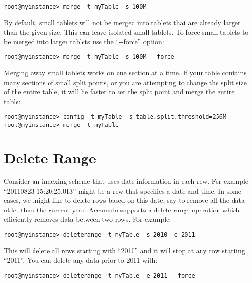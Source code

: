 \begingroup\fontsize{8pt}{8pt}\selectfont\begin{verbatim}
root@myinstance> merge -t myTable -s 100M
\end{verbatim}\endgroup

By default, small tablets will not be merged into tablets that are
already larger than the given size. This can leave isolated small
tablets. To force small tablets to be merged into larger tablets use
the ``-{}-force'' option:

\begingroup\fontsize{8pt}{8pt}\selectfont\begin{verbatim}
root@myinstance> merge -t myTable -s 100M --force
\end{verbatim}\endgroup

Merging away small tablets works on one section at a time. If your
table contains many sections of small split points, or you are
attempting to change the split size of the entire table, it will be
faster to set the split point and merge the entire table:

\begingroup\fontsize{8pt}{8pt}\selectfont\begin{verbatim}
root@myinstance> config -t myTable -s table.split.threshold=256M
root@myinstance> merge -t myTable
\end{verbatim}\endgroup

\section{Delete Range}

Consider an indexing scheme that uses date information in each row.
For example ``20110823-15:20:25.013'' might be a row that specifies a
date and time. In some cases, we might like to delete rows based on
this date, say to remove all the data older than the current year.
Accumulo supports a delete range operation which efficiently
removes data between two rows. For example:

\begingroup\fontsize{8pt}{8pt}\selectfont\begin{verbatim}
root@myinstance> deleterange -t myTable -s 2010 -e 2011
\end{verbatim}\endgroup

This will delete all rows starting with ``2010'' and it will stop at
any row starting ``2011''. You can delete any data prior to 2011
with:

\begingroup\fontsize{8pt}{8pt}\selectfont\begin{verbatim}
root@myinstance> deleterange -t myTable -e 2011 --force
\end{verbatim}\endgroup

